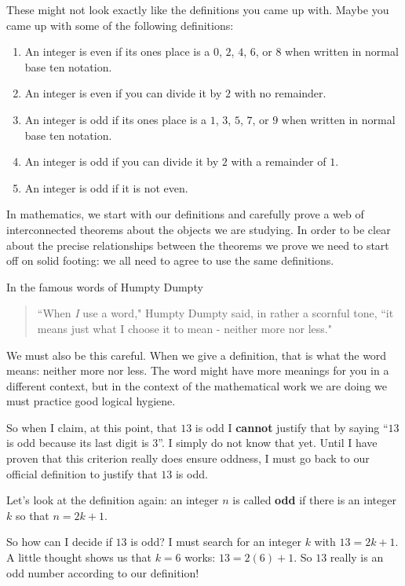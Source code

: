 These might not look exactly like the definitions you came up with.  Maybe you came up with some of the following definitions:

\begin{enumerate}
	\item An integer is even if its ones place is a $0$, $2$, $4$, $6$, or $8$ when written in normal base ten notation.
	\item An integer is even if you can divide it by $2$ with no remainder.
	\item An integer is odd if its ones place is a $1$, $3$, $5$, $7$, or $9$ when written in normal base ten notation.
	\item An integer is odd if you can divide it by $2$ with a remainder of $1$.
	\item An integer is odd if it is not even.
\end{enumerate}

In mathematics, we start with our definitions and carefully prove a web of interconnected theorems about the objects we are studying.   In order to be clear about the precise relationships between the theorems we prove we need to start off on solid footing:  we all need to agree to use the same definitions.

In the famous words of Humpty Dumpty \cite{car22}

\begin{quote}
	``When \textit{I} use a word," Humpty Dumpty said, in rather a scornful tone, ``it means just what I choose it to mean - neither more nor less."
\end{quote}

We must also be this careful. When we give a definition, that is what the word means:  neither more nor less.  The word might have more meanings for you in a different context, but in the context of the mathematical work we are doing we must practice good logical hygiene.

So when I claim, at this point, that $13$ is odd I \textbf{cannot} justify that by saying ``$13$ is odd because its last digit is $3$''.  I simply do not know that yet.  Until I have proven that this criterion really does ensure oddness, I must go back to our official definition to justify that $13$ is odd.  

Let's look at the definition again:  	an integer $n$ is called \textbf{odd} if  there is an integer $k$ so that $n = 2k+1$.

So how can I decide if $13$ is odd?  I must search for an integer $k$ with $13 = 2k+1$.  A little thought shows us that $k=6$ works:  $13 = 2(6)+1$.  So $13$ really is an odd number according to our definition!

